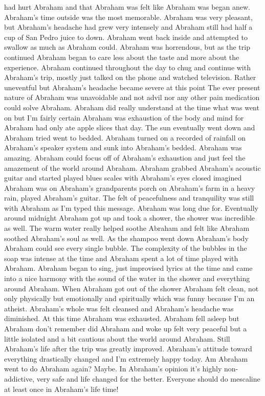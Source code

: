 \documentclass[12pt]{book}
\begin{document}
had hurt Abraham and that Abraham was felt like Abraham was began anew. Abraham's time outside was the most memorable. Abraham was very pleasant, but Abraham's headache had grew very intensely and Abraham still had half a cup of San Pedro juice to down. Abraham went back inside and attempted to swallow as much as Abraham could. Abraham was horrendous, but as the trip continued Abraham began to care less about the taste and more about the experience. Abraham continued throughout the day to chug and continue with Abraham's trip, mostly just talked on the phone and watched television. Rather uneventful but Abraham's headache became severe at this point The ever present nature of Abraham was unavoidable and not advil nor any other pain medication could solve Abraham. Abraham did really understand at the time what was went on but I'm fairly certain Abraham was exhaustion of the body and mind for Abraham had only ate apple slices that day. The sun eventually went down and Abraham tried went to bedded. Abraham turned on a recorded of rainfall on Abraham's speaker system and sunk into Abraham's bedded. Abraham was amazing. Abraham could focus off of Abraham's exhaustion and just feel the amazement of the world around Abraham. Abraham grabbed Abraham's acoustic guitar and started played blues scales with Abraham's eyes closed imagined Abraham was on Abraham's grandparents porch on Abraham's farm in a heavy rain, played Abraham's guitar. The felt of peacefulness and tranquility was still with Abraham as I'm typed this message. Abraham was long due for. Eventually around midnight Abraham got up and took a shower, the shower was incredible as well. The warm water really helped soothe Abraham and felt like Abraham soothed Abraham's soul as well. As the shampoo went down Abraham's body Abraham could see every single bubble. The complexity of the bubbles in the soap was intense at the time and Abraham spent a lot of time played with Abraham. Abraham began to sing, just improvised lyrics at the time and came into a nice harmony with the sound of the water in the shower and everything around Abraham. When Abraham got out of the shower Abraham felt clean, not only physically but emotionally and spiritually which was funny because I'm an atheist. Abraham's whole was felt cleansed and Abraham's headache was diminished. At this time Abraham was exhausted. Abraham fell asleep but Abraham don't remember did Abraham and woke up felt very peaceful but a little isolated and a bit cautious about the world around Abraham. Still Abraham's life after the trip was greatly improved. Abraham's attitude toward everything drastically changed and I'm extremely happy today. Am Abraham went to do Abraham again? Maybe. In Abraham's opinion it's highly non-addictive, very safe and life changed for the better. Everyone should do mescaline at least once in Abraham's life time!
\end{document}

